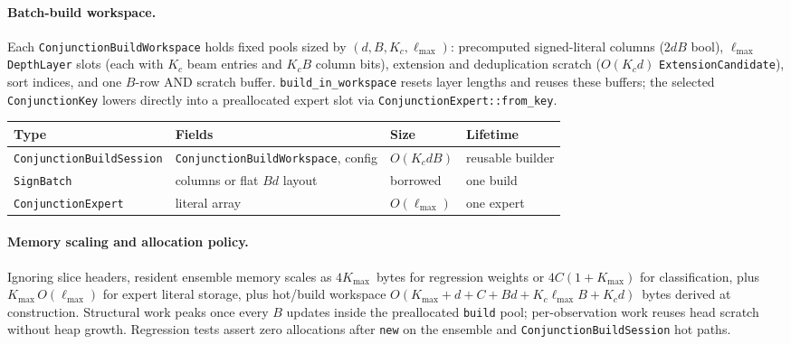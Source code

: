 \documentclass[11pt]{article}
\begin{document}
\paragraph{Batch-build workspace.}
Each \texttt{ConjunctionBuildWorkspace} holds fixed pools sized by
$(d,B,K_c,\ell_{\max})$: precomputed signed-literal columns ($2dB$ bool),
$\ell_{\max}$ \texttt{DepthLayer} slots (each with $K_c$ beam entries and
$K_cB$ column bits), extension and deduplication scratch
($O(K_c d)$ \texttt{ExtensionCandidate}), sort indices, and one $B$-row AND
scratch buffer.  \texttt{build\_in\_workspace} resets layer lengths and reuses
these buffers; the selected \texttt{ConjunctionKey} lowers directly into a
preallocated expert slot via \texttt{ConjunctionExpert::from\_key}.

\begin{center}
\scriptsize
\setlength{\tabcolsep}{3pt}
\begin{tabular}{@{}p{}p{}p{}p{}@{}}
\hline
\textbf{Type} & \textbf{Fields} & \textbf{Size} & \textbf{Lifetime} \\
\hline
\texttt{ConjunctionBuildSession} & \texttt{ConjunctionBuildWorkspace}, config & $O(K_c dB)$ & reusable builder \\
\texttt{SignBatch} & columns or flat $Bd$ layout & borrowed & one build \\
\texttt{ConjunctionExpert} & literal array & $O(\ell_{\max})$ & one expert \\
\hline
\end{tabular}
\end{center}

\paragraph{Memory scaling and allocation policy.}
Ignoring slice headers, resident ensemble memory scales as
$4K_{\max}$~bytes for regression weights or $4C(1{+}K_{\max})$ for
classification, plus $K_{\max}\,O(\ell_{\max})$ for expert literal storage,
plus hot/build workspace $O(K_{\max}+d+C+Bd+K_c\ell_{\max}B+K_c d)$~bytes
derived at construction.  Structural work peaks once every $B$ updates inside the
preallocated \texttt{build} pool; per-observation work reuses head scratch
without heap growth.  Regression tests assert zero allocations after
\texttt{new} on the ensemble and \texttt{ConjunctionBuildSession} hot paths.
\end{document}
